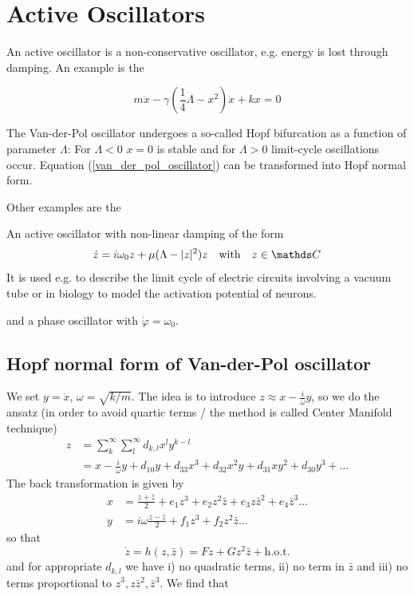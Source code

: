 \documentclass{notebook}
\begin{document}
\section{Active Oscillators}

An active oscillator is a non-conservative oscillator, e.g. energy is lost through damping. An example is the 
%
\begin{theorem}
	\begin{equation}
	m \ddot{x} - \gamma (\frac{1}{4} \Lambda - x^2) \dot{x} + kx = 0
	\label{van_der_pol_oscillator}
	\end{equation}
\end{theorem}
%
The Van-der-Pol oscillator undergoes a so-called Hopf bifurcation as a function of parameter $\Lambda$: For $\Lambda < 0$ $x = 0$ is stable and for $\Lambda > 0$ limit-cycle oscillations occur. Equation (\ref{van_der_pol_oscillator}) can be transformed into Hopf normal form. 

Other examples are the 
%
\begin{theorem}
	An active oscillator with non-linear damping of the form
	\begin{equation}
	\dot{z} = i \omega_0 z + \mu(\Lambda - |z|^2)z \quad \mathrm{with} \quad z \in \C
	\end{equation}
	It is used e.g. to describe the limit cycle of electric circuits involving a vacuum tube or in biology to model the activation potential of neurons.
\end{theorem}
%
and a phase oscillator with $\dot{\varphi} = \omega_0$. 

\subsection*{Hopf normal form of Van-der-Pol oscillator}

We set $y = \dot{x}$, $\omega = \sqrt{k/m}$. The idea is to introduce $z \approx x - \frac{i}{\omega} y$, so we do the ansatz (in order to avoid quartic terms / the method is called Center Manifold technique)
%
\begin{align*}
	z &= \sum_{k}^{\infty}\sum_{l}^{\infty}{d_{k,l}x^l y^{k-l}} \\
	&= x - \frac{i}{\omega} y + d_{10}y + d_{33}x^3 + d_32 x^2 y + d_{31} xy^2 + d_{30} y^3 + \dots
\end{align*}
%
The back transformation is given by
%
\begin{align*}
	x &= \frac{z + \bar{z}}{2} + e_1 z^3 + e_2 z^2 \bar{z} + e_3 z \bar{z}^2 + e_4 \bar{z}^3 \dots \\
	y &= i \omega \frac{z - \bar{z}}{2} + f_1 z^3 + f_2 z^2 \bar{z} \dots
\end{align*}
%
so that
%
\begin{equation}
\dot{z} = h(z, \bar{z}) = Fz + G z^2 \bar{z} + \mathrm{h.o.t.}
\end{equation}
%
and for appropriate $d_{k,l}$ we have i) no quadratic terms, ii) no term in $\bar{z}$ and iii) no terms proportional to $z^3, z\bar{z}^2, \bar{z}^3$. We find that
\end{document}
